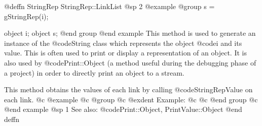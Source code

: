 @deffn {StringRep} StringRep::LinkList
@sp 2
@example
@group
s = gStringRep(i);

object  i;
object  s;
@end group
@end example
This method is used to generate an instance of the @code{String} class
which represents the object @code{i} and its value.  This is often used
to print or display a representation of an object.  It is also used
by @code{Print::Object} (a method useful during the debugging phase of
a project) in order to directly print an object to a stream.


This method obtains the values of each link by calling @code{StringRepValue}
on each link.
@c @example
@c @group
@c @exdent Example:
@c 
@c @end group
@c @end example
@sp 1
See also:  @code{Print::Object, PrintValue::Object}
@end deffn











